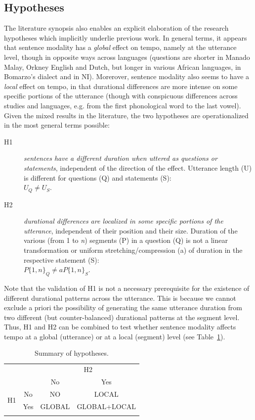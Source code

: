 \subsection{Hypotheses}\label{sec431}
The literature synopsis also enables an explicit elaboration of the research hypotheses which implicitly underlie previous work. In general terms, it appears that sentence modality has a \textit{global} effect on tempo, namely at the utterance level, though in opposite ways across languages (questions are shorter in Manado Malay, Orkney English and Dutch, but longer in various African languages, in Bomarzo's dialect and in NI). Morerover, sentence modality also seems to have a \textit{local} effect on tempo, in that durational differences are more intense on some specific portions of the utterance (though with conspicuous differences across studies and languages, e.g. from the first phonological word to the last vowel). Given the mixed results in the literature, the two hypotheses are operationalized in the most general terms possible: 

\begin{description}
   \item[H1] \textit{sentences have a different duration when uttered as questions or statements}, independent of the direction of the  effect. Utterance length (U) is different for questions (Q) and statements (S):\\ $U_{Q} \neq U_{S}$.
   \item[H2] \textit{durational differences are localized in some specific portions of the utterance}, independent of their position and their size. Duration of the various (from 1 to \textit{n}) segments (P) in a question (Q) is not a linear transformation or uniform stretching/compression (a) of duration in the respective statement (S):\\ $P\{1,n\}_{Q} \neq aP\{1,n\}_{S}$.
\end{description}

Note that the validation of H1 is not a necessary prerequisite for the existence of different durational patterns across the utterance. This is because we cannot exclude a priori the possibility of generating the same utterance duration from two different (but counter-balanced) durational patterns at the segment level. Thus, H1 and H2 can be combined to test whether sentence modality affects tempo at a global (utterance) or at a local (segment) level (see Table~\ref{tab42}).

\begin{table}[h]
\centering
\begin{tabular}{c c  c c}
\mytoprule
 & & \multicolumn{2}{c}{H2}\\
&  & No & Yes\\
\midrule
\multirow{2}{*}{H1} & No & NO & LOCAL\\
 & Yes & GLOBAL & GLOBAL+LOCAL\\
 \mybottomrule
\end{tabular}
\caption{Summary of hypotheses.}
\label{tab42}\end{table}

